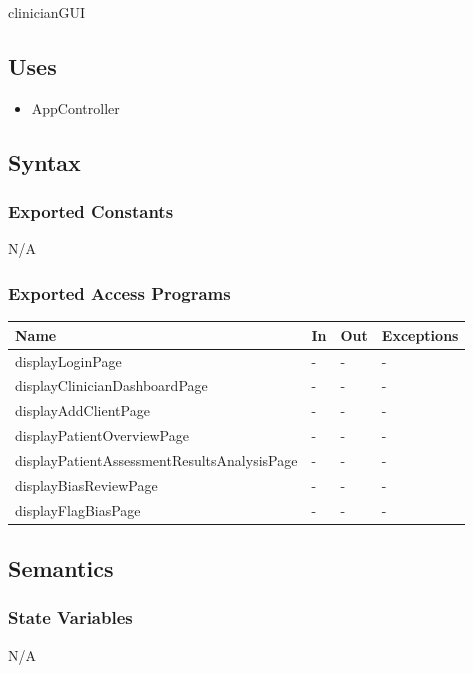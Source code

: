 \documentclass[12pt, titlepage]{article}
\begin{document}
clinicianGUI

\subsection{Uses}

\begin{itemize}
  \item AppController
\end{itemize}

\subsection{Syntax}

\subsubsection{Exported Constants}

N/A

\subsubsection{Exported Access Programs}

\begin{center}
\begin{tabular}{p{8cm} p{2cm} p{2cm} p{2cm}}
\hline
\textbf{Name} & \textbf{In} & \textbf{Out} & \textbf{Exceptions} \\
\hline
displayLoginPage & - & - & - \\
displayClinicianDashboardPage & - & - & - \\
displayAddClientPage & - & - & - \\
displayPatientOverviewPage & - & - & - \\
displayPatientAssessmentResultsAnalysisPage & - & - & - \\
displayBiasReviewPage & - & - & - \\
displayFlagBiasPage & - & - & - \\
\hline
\end{tabular}
\end{center}

\subsection{Semantics}

\subsubsection{State Variables}
N/A
\end{document}
